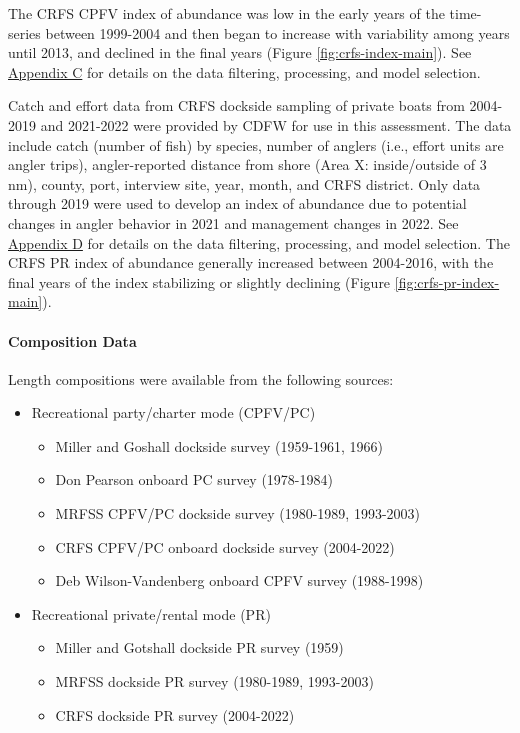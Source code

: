 \documentclass[11pt,
  english,
  letterpaper,
]{article}
\providecommand{\tightlist}{%
  \setlength{\itemsep}{0pt}\setlength{\parskip}{0pt}}
\providecommand{\tightlist}{%
  \setlength{\itemsep}{0pt}\setlength{\parskip}{0pt}}
\begin{document}
The CRFS CPFV index of abundance was low in the early years of the time-series between 1999-2004 and then began to increase with variability among years until 2013, and declined in the final years (Figure \ref{fig:crfs-index-main}). See \protect\hyperlink{onboard-cpfv-index}{Appendix C} for details on the data filtering, processing, and model selection.

Catch and effort data from CRFS dockside sampling of private boats from 2004-2019 and 2021-2022 were provided by CDFW for use in this assessment. The data include catch (number of fish) by species, number of anglers (i.e., effort units are angler trips), angler-reported distance from shore (Area X: inside/outside of 3 nm), county, port, interview site, year, month, and CRFS district. Only data through 2019 were used to develop an index of abundance due to potential changes in angler behavior in 2021 and management changes in 2022. See \protect\hyperlink{crfs-pr-index}{Appendix D} for details on the data filtering, processing, and model selection. The CRFS PR index of abundance generally increased between 2004-2016, with the final years of the index stabilizing or slightly declining (Figure \ref{fig:crfs-pr-index-main}).

\hypertarget{composition-data-1}{%
\paragraph{Composition Data}\label{composition-data-1}}

\hfill\break

Length compositions were available from the following sources:

\begin{itemize}
\item
  Recreational party/charter mode (CPFV/PC)

  \begin{itemize}
  \tightlist
  \item
    Miller and Goshall dockside survey (1959-1961, 1966)
  \item
    Don Pearson onboard PC survey (1978-1984)
  \item
    MRFSS CPFV/PC dockside survey (1980-1989, 1993-2003)
  \item
    CRFS CPFV/PC onboard dockside survey (2004-2022)
  \item
    Deb Wilson-Vandenberg onboard CPFV survey (1988-1998)
  \end{itemize}
\item
  Recreational private/rental mode (PR)

  \begin{itemize}
  \tightlist
  \item
    Miller and Gotshall dockside PR survey (1959)
  \item
    MRFSS dockside PR survey (1980-1989, 1993-2003)
  \item
    CRFS dockside PR survey (2004-2022)
  \end{itemize}
\end{itemize}
\end{document}
